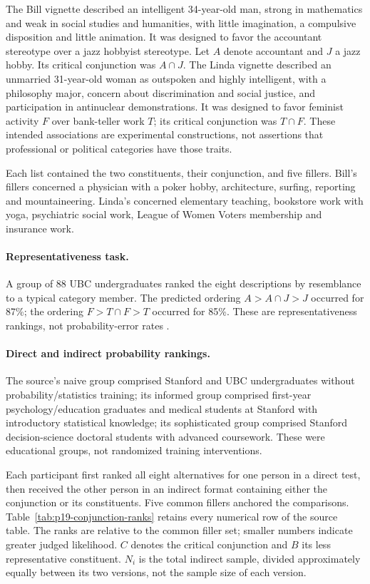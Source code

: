 The Bill vignette described an intelligent 34-year-old man, strong in
mathematics and weak in social studies and humanities, with little
imagination, a compulsive disposition and little animation.
It was designed to favor the accountant stereotype over a jazz
hobbyist stereotype. Let \(A\) denote accountant and \(J\) a jazz hobby.
Its critical conjunction was \(A\cap J\).
The Linda vignette described an unmarried 31-year-old woman as outspoken
and highly intelligent, with a philosophy major, concern about
discrimination and social justice, and participation in antinuclear
demonstrations. It was designed to favor feminist activity \(F\)
over bank-teller work \(T\); its critical conjunction was \(T\cap F\).
These intended associations are experimental constructions, not
assertions that professional or political categories have those traits.

Each list contained the two constituents, their conjunction, and five
fillers. Bill's fillers concerned a physician with a poker hobby,
architecture, surfing, reporting and mountaineering. Linda's concerned
elementary teaching, bookstore work with yoga, psychiatric social work,
League of Women Voters membership and insurance work.

\paragraph{Representativeness task.}
A group of 88 UBC undergraduates ranked the eight descriptions by
resemblance to a typical category member. The predicted ordering
\(A>A\cap J>J\) occurred for 87\%; the ordering
\(F>T\cap F>T\) occurred for 85\%.
These are representativeness rankings, not probability-error rates
\cite[p.~297]{TverskyKahneman1983Conjunction}.

\paragraph{Direct and indirect probability rankings.}
The source's naive group comprised Stanford and UBC undergraduates
without probability/statistics training; its informed group comprised
first-year psychology/education graduates and medical students at Stanford
with introductory statistical knowledge; its sophisticated group comprised
Stanford decision-science doctoral students with advanced coursework.
These were educational groups, not randomized training interventions.

Each participant first ranked all eight alternatives for one person
in a direct test, then received the other person in an indirect format
containing either the conjunction or its constituents. Five common
fillers anchored the comparisons. Table~\ref{tab:p19-conjunction-ranks}
retains every numerical row of the source table. The ranks are relative
to the common filler set; smaller numbers indicate greater judged likelihood.
\(C\) denotes the critical conjunction and \(B\) its less representative
constituent. \(N_i\) is the total indirect sample, divided approximately
equally between its two versions, not the sample size of each version.

